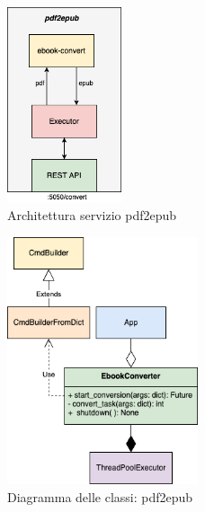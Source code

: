 \begin{figure}[H]
\centering
\includegraphics[width=0.3\textwidth]{img/tesi-4-pdf2epub.drawio.png}
\caption{Architettura servizio pdf2epub}
\end{figure}
\begin{figure}[H]
\centering
\includegraphics[width=0.5\textwidth]{img/tesi-5-pdf2epub.drawio.png}
\caption{Diagramma delle classi: pdf2epub}
\end{figure}

